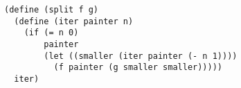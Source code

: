 \documentclass[a4paper,12pt]{article}
\begin{document}
\begin{lstlisting}
(define (split f g)
  (define (iter painter n)
    (if (= n 0)
        painter
        (let ((smaller (iter painter (- n 1))))
          (f painter (g smaller smaller)))))
  iter)
\end{lstlisting}
\end{document}
